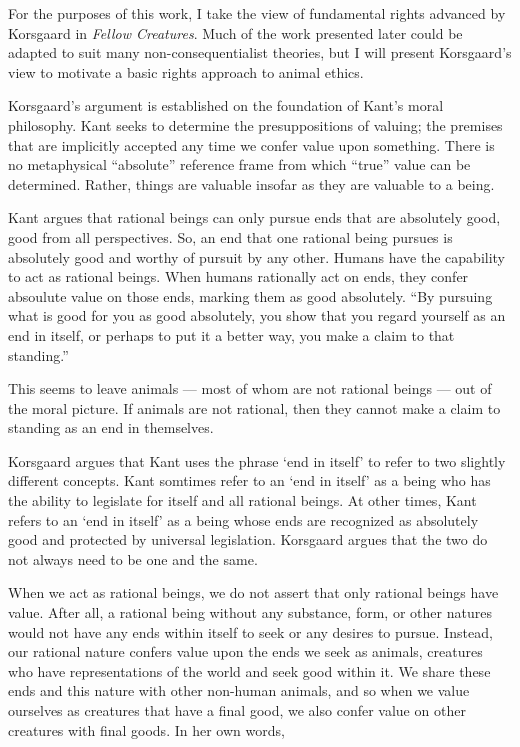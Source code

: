 	For the purposes of this work, I take the view of fundamental rights
	advanced by Korsgaard in \emph{Fellow
	Creatures}.\autocite{korsgaard_fellow_creatures} Much of the work presented
	later could be adapted to suit many non-consequentialist theories, but I
	will present Korsgaard’s view to motivate a basic rights approach to animal
	ethics.

	Korsgaard’s argument is established on the foundation of Kant’s moral
	philosophy.  Kant seeks to determine the presuppositions of valuing; the
	premises that are implicitly accepted any time we confer value upon
	something.  There is no metaphysical “absolute” reference frame from which
	“true” value can be determined.  Rather, things are valuable insofar as
	they are valuable to a being.

	Kant argues that rational beings can only pursue ends that are absolutely
	good, good from all perspectives.\autocite[8.4.1]{korsgaard_fellow_creatures} So, an end that one
	rational being pursues is absolutely good and worthy of pursuit by any
	other.  Humans have the capability to act as rational beings.  When humans
	rationally act on ends, they confer absoulute value on those ends, marking
	them as good absolutely.  “By pursuing what is good for you as good
	absolutely, you show that you regard yourself as an end in itself, or
	perhaps to put it a better way, you make a claim to that
	standing.”\autocite[8.4.4]{korsgaard_fellow_creatures}

	This seems to leave animals --- most of whom are not rational beings ---
	out of the moral picture.  If animals are not rational, then they cannot
	make a claim to standing as an end in themselves.

	Korsgaard argues that Kant uses the phrase ‘end in itself’ to refer to two
	slightly different concepts.  Kant somtimes refer to an ‘end in itself’ as
	a being who has the ability to legislate for itself and all rational
	beings.  At other times, Kant refers to an ‘end in itself’ as a being whose
	ends are recognized as absolutely good and protected by universal
	legislation.  Korsgaard argues that the two do not always need to be one
	and the same.

	When we act as rational beings, we do not assert that only rational beings
	have value.  After all, a rational being without any substance, form, or
	other natures would not have any ends within itself to seek or any desires
	to pursue.  Instead, our rational nature confers value upon the ends we
	seek as animals, creatures who have representations of the world and seek
	good within it.  We share these ends and this nature with other non-human
	animals, and so when we value ourselves as creatures that have a final
	good, we also confer value on other creatures with final goods.  In her own
	words,

